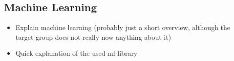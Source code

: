 \subsection{Machine Learning}
\begin{itemize}
  \item Explain machine learning (probably just a short overview, although the target group does not really now anything about it)
  \item Quick explanation of the used ml-library
\end{itemize}